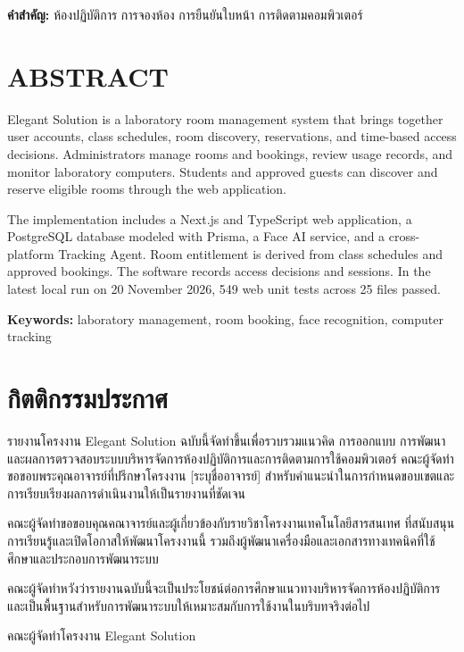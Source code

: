 \documentclass[14pt,a4paper,oneside]{extreport}
\begin{document}
\noindent\textbf{คำสำคัญ:} ห้องปฏิบัติการ การจองห้อง การยืนยันใบหน้า การติดตามคอมพิวเตอร์

\chapter*{ABSTRACT}
Elegant Solution is a laboratory room management system that brings together user accounts, class schedules, room discovery, reservations, and time-based access decisions. Administrators manage rooms and bookings, review usage records, and monitor laboratory computers. Students and approved guests can discover and reserve eligible rooms through the web application.

The implementation includes a Next.js and TypeScript web application, a PostgreSQL database modeled with Prisma, a Face AI service, and a cross-platform Tracking Agent. Room entitlement is derived from class schedules and approved bookings. The software records access decisions and sessions. In the latest local run on 20 November 2026, 549 web unit tests across 25 files passed.

\noindent\textbf{Keywords:} laboratory management, room booking, face recognition, computer tracking

\chapter*{กิตติกรรมประกาศ}
รายงานโครงงาน Elegant Solution ฉบับนี้จัดทำขึ้นเพื่อรวบรวมแนวคิด การออกแบบ การพัฒนา และผลการตรวจสอบระบบบริหารจัดการห้องปฏิบัติการและการติดตามการใช้คอมพิวเตอร์ คณะผู้จัดทำขอขอบพระคุณอาจารย์ที่ปรึกษาโครงงาน [ระบุชื่ออาจารย์] สำหรับคำแนะนำในการกำหนดขอบเขตและการเรียบเรียงผลการดำเนินงานให้เป็นรายงานที่ชัดเจน

คณะผู้จัดทำขอขอบคุณคณาจารย์และผู้เกี่ยวข้องกับรายวิชาโครงงานเทคโนโลยีสารสนเทศ ที่สนับสนุนการเรียนรู้และเปิดโอกาสให้พัฒนาโครงงานนี้ รวมถึงผู้พัฒนาเครื่องมือและเอกสารทางเทคนิคที่ใช้ศึกษาและประกอบการพัฒนาระบบ

คณะผู้จัดทำหวังว่ารายงานฉบับนี้จะเป็นประโยชน์ต่อการศึกษาแนวทางบริหารจัดการห้องปฏิบัติการ และเป็นพื้นฐานสำหรับการพัฒนาระบบให้เหมาะสมกับการใช้งานในบริบทจริงต่อไป

\begin{flushright}คณะผู้จัดทำโครงงาน Elegant Solution\end{flushright}

\tableofcontents\clearpage
{}
\listoftables\clearpage
{}
\listoffigures\clearpage
{}
\end{document}
